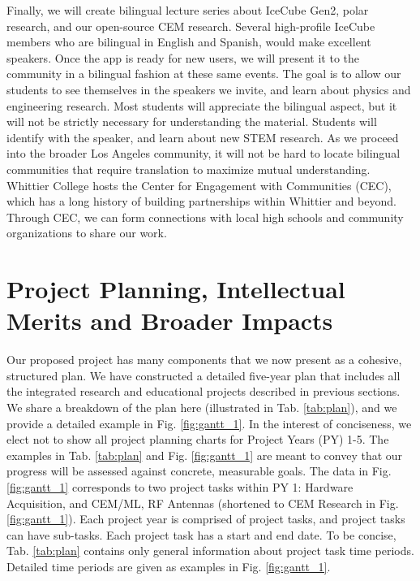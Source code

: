 \documentclass[11pt]{amsart}
\begin{document}
Finally, we will create bilingual lecture series about IceCube Gen2, polar research, and our open-source CEM research.  Several high-profile IceCube members who are bilingual in English and Spanish, would make excellent speakers.  Once the app is ready for new users, we will present it to the community in a bilingual fashion at these same events.  The goal is to allow our students to see themselves in the speakers we invite, and learn about physics and engineering research.  Most students will appreciate the bilingual aspect, but it will not be strictly necessary for understanding the material.  Students will identify with the speaker, and learn about new STEM research.  As we proceed into the broader Los Angeles community, it will not be hard to locate bilingual communities that require translation to maximize mutual understanding.  Whittier College hosts the Center for Engagement with Communities (CEC), which has a long history of building partnerships within Whittier and beyond.  Through CEC, we can form connections with local high schools and community organizations to share our work.

\section{Project Planning, Intellectual Merits and Broader Impacts}
\label{sec:time_im}

Our proposed project has many components that we now present as a cohesive, structured plan.  We have constructed a detailed five-year plan that includes all the integrated research and educational projects described in previous sections.  We share a breakdown of the plan here (illustrated in Tab. \ref{tab:plan}), and we provide a detailed example in Fig. \ref{fig:gantt_1}.  In the interest of conciseness, we elect not to show all project planning charts for Project Years (PY) 1-5.  The examples in Tab. \ref{tab:plan} and Fig. \ref{fig:gantt_1} are meant to convey that our progress will be assessed against concrete, measurable goals.  The data in Fig. \ref{fig:gantt_1} corresponds to two project tasks within PY 1: Hardware Acquisition, and CEM/ML, RF Antennas (shortened to CEM Research in Fig. \ref{fig:gantt_1}).  Each project year is comprised of project tasks, and project tasks can have sub-tasks.  Each project task has a start and end date.  To be concise, Tab. \ref{tab:plan} contains only general information about project task time periods.  Detailed time periods are given as examples in Fig. \ref{fig:gantt_1}.
\end{document}
